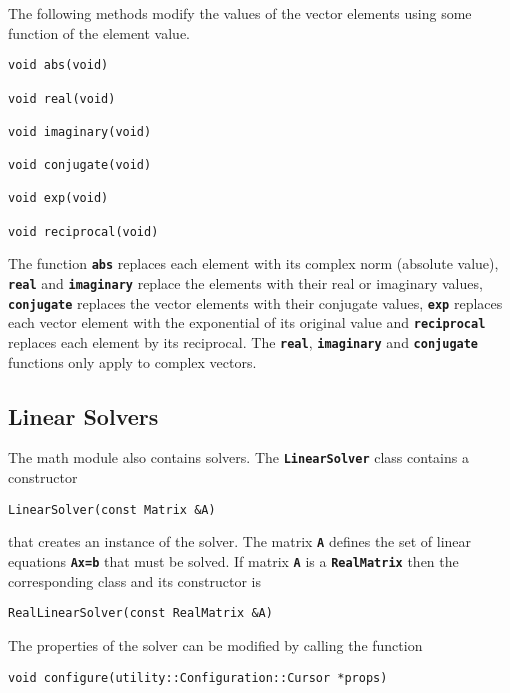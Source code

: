 The following methods modify the values of the vector elements using some function of the element value.

{
\color{red}
\begin{Verbatim}[fontseries=b]
void abs(void)

void real(void)

void imaginary(void)

void conjugate(void)

void exp(void)

void reciprocal(void)
\end{Verbatim}
}

The function \texttt{\textbf{abs}} replaces each element with its complex norm (absolute value), \texttt{\textbf{real}} and \texttt{\textbf{imaginary}} replace the elements with their real or imaginary values, \texttt{\textbf{conjugate}} replaces the vector elements with their conjugate values, \texttt{\textbf{exp}} replaces each vector element with the exponential of its original value and \texttt{\textbf{reciprocal}} replaces each element by its reciprocal. The \texttt{\textbf{real}}, \texttt{\textbf{imaginary}} and \texttt{\textbf{conjugate}} functions only apply to complex vectors.

\subsection{Linear Solvers}

The math module also contains solvers. The \texttt{\textbf{LinearSolver}} class contains a constructor

{
\color{red}
\begin{Verbatim}[fontseries=b]
LinearSolver(const Matrix &A)
\end{Verbatim}
}

that creates an instance of the solver. The matrix \texttt{\textbf{A}} defines the set of linear equations \texttt{\textbf{Ax=b}} that must be solved. If matrix \texttt{\textbf{A}} is a \texttt{\textbf{RealMatrix}} then the corresponding class and its constructor is

{
\color{red}
\begin{Verbatim}[fontseries=b]
RealLinearSolver(const RealMatrix &A)
\end{Verbatim}
}

The properties of the solver can be modified by calling the function

{
\color{red}
\begin{Verbatim}[fontseries=b]
void configure(utility::Configuration::Cursor *props)
\end{Verbatim}
}

